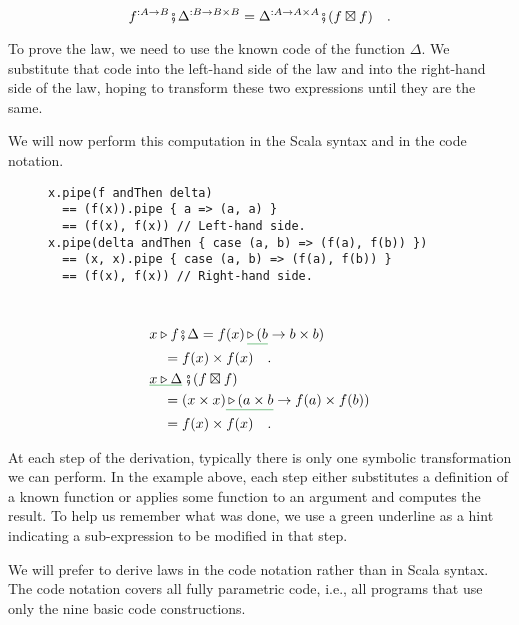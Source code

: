 ~\vspace{-0.3\baselineskip}
\[
f^{:A\rightarrow B}\bef\Delta^{:B\rightarrow B\times B}=\Delta^{:A\rightarrow A\times A}\bef(f\boxtimes f)\quad.
\]

\noindent To prove the law, we need to use the known code of the function
$\Delta$. We substitute that code into the left-hand side of the
law and into the right-hand side of the law, hoping to transform these
two expressions until they are the same.

We will now perform this computation in the Scala syntax and in the
code notation.

\begin{wrapfigure}{L}{0.54\columnwidth}%
\vspace{-0.6\baselineskip}
\begin{lstlisting}
x.pipe(f andThen delta)
  == (f(x)).pipe { a => (a, a) }
  == (f(x), f(x)) // Left-hand side.
x.pipe(delta andThen { case (a, b) => (f(a), f(b)) })
  == (x, x).pipe { case (a, b) => (f(a), f(b)) }
  == (f(x), f(x)) // Right-hand side.
\end{lstlisting}
\vspace{-3\baselineskip}
\end{wrapfigure}%

~\vspace{-1.4\baselineskip}
\begin{align*}
 & x\triangleright f\bef\Delta=f(x)\,\gunderline{\triangleright\,(b}\rightarrow b\times b)\\
 & \quad=f(x)\times f(x)\quad.\\
 & \gunderline{x\triangleright\Delta}\,\bef(f\boxtimes f)\\
 & \quad=(x\times x)\gunderline{\,\triangleright\,(a\times b}\rightarrow f(a)\times f(b))\\
 & \quad=f(x)\times f(x)\quad.
\end{align*}
\vspace{-1.5\baselineskip}

At each step of the derivation, typically there is only one symbolic
transformation we can perform. In the example above, each step either
substitutes a definition of a known function or applies some function
to an argument and computes the result. To help us remember what was
done, we use a green underline as a hint indicating a sub-expression
to be modified in that step. 

We will prefer to derive laws in the code notation rather than in
Scala syntax. The code notation covers all fully parametric code,
i.e., all programs that use only the nine basic code constructions.

